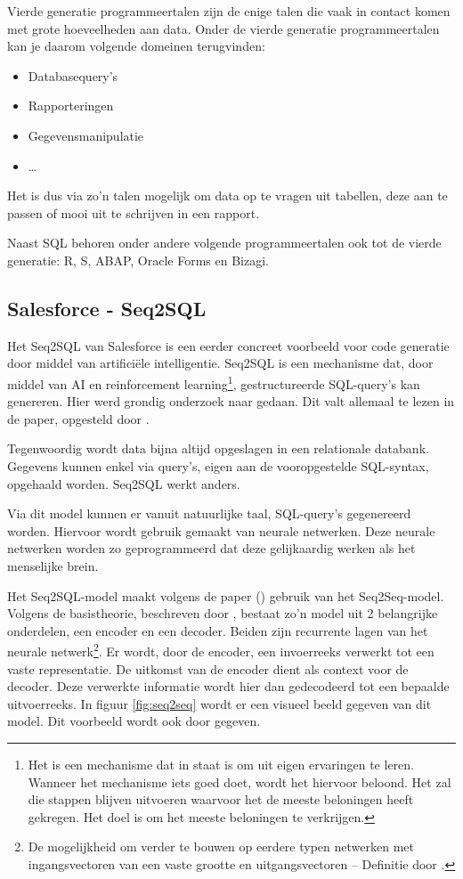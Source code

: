 Vierde generatie programmeertalen zijn de enige talen die vaak in contact komen met grote hoeveelheden aan data. Onder de vierde generatie programmeertalen kan je daarom volgende domeinen terugvinden:
\begin{itemize}
	\item Databasequery’s
	\item Rapporteringen
	\item Gegevensmanipulatie
	\item \dots
\end{itemize}

Het is dus via zo’n talen mogelijk om data op te vragen uit tabellen, deze aan te passen of mooi uit te schrijven in een rapport.

Naast SQL behoren onder andere volgende programmeertalen ook tot de vierde generatie: R, S, ABAP, Oracle Forms en Bizagi.

\subsection{Salesforce - Seq2SQL}
\label{sec:Salesforce - Seq2SQL}

Het Seq2SQL van Salesforce is een eerder concreet voorbeeld voor code generatie door middel van artificiële intelligentie. Seq2SQL is een mechanisme dat, door middel van AI en reinforcement learning\footnote{Het is een mechanisme dat in staat is om uit eigen ervaringen te leren. Wanneer het mechanisme iets goed doet, wordt het hiervoor beloond. Het zal die stappen blijven uitvoeren waarvoor het de meeste beloningen heeft gekregen. Het doel is om het meeste beloningen te verkrijgen.}, gestructureerde SQL-query’s kan genereren. Hier werd grondig onderzoek naar gedaan. Dit valt allemaal te lezen in de paper, opgesteld door \textcite{seq2sqlPaper}.

Tegenwoordig wordt data bijna altijd opgeslagen in een relationale databank. Gegevens kunnen enkel via query’s, eigen aan de vooropgestelde SQL-syntax, opgehaald worden. Seq2SQL werkt anders.

Via dit model kunnen er vanuit natuurlijke taal, SQL-query’s gegenereerd worden. Hiervoor wordt gebruik gemaakt van neurale netwerken. Deze neurale netwerken worden zo geprogrammeerd dat deze gelijkaardig werken als het menselijke brein. 

Het Seq2SQL-model maakt volgens de paper (\textcite{seq2sqlPaper}) gebruik van het Seq2Seq-model. Volgens de basistheorie, beschreven door \textcite{drnn}, bestaat zo’n model uit 2 belangrijke onderdelen, een encoder en een decoder. Beiden zijn recurrente lagen van het neurale netwerk\footnote{De mogelijkheid om verder te bouwen op eerdere typen netwerken met ingangsvectoren van een vaste grootte en uitgangsvectoren – Definitie door \textcite{rnn}.}. Er wordt, door de encoder, een invoerreeks verwerkt tot een vaste representatie. De uitkomst van de encoder dient als context voor de decoder. Deze verwerkte informatie wordt hier dan gedecodeerd tot een bepaalde uitvoerreeks. In figuur \ref{fig:seq2seq} wordt er een visueel beeld gegeven van dit model. Dit voorbeeld wordt ook door \textcite{drnn} gegeven.

